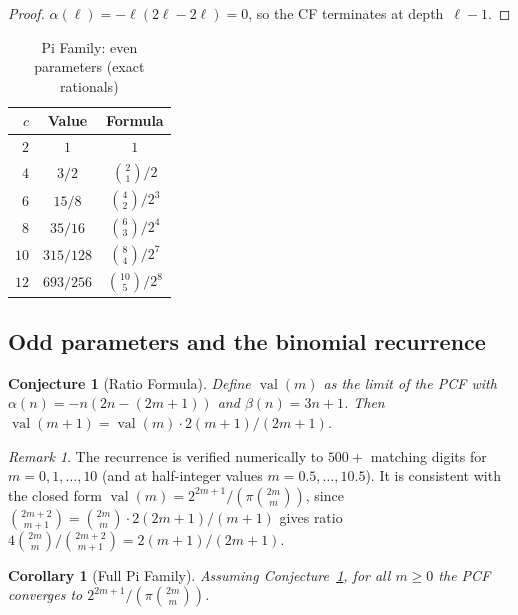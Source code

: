 \documentclass[11pt,a4paper]{article}
\theoremstyle{plain}
\newtheorem{corollary}[theorem]{Corollary}
\newtheorem{conjecture}[theorem]{Conjecture}
\theoremstyle{definition}
\theoremstyle{remark}
\newtheorem{remark}[theorem]{Remark}
\begin{document}
\begin{proof}
$\alpha(\ell) = -\ell(2\ell - 2\ell) = 0$, so the CF terminates
at depth~$\ell{-}1$.\end{proof}

\begin{table}[ht]
\centering
\caption{Pi Family: even parameters (exact rationals)}\label{tab:parity}
\begin{tabular}{@{}rcc@{}}
\toprule
$c$ & Value & Formula \\
\midrule
$2$ & $1$ & $1$ \\
$4$ & $3/2$ & $\binom{2}{1}/2$ \\
$6$ & $15/8$ & $\binom{4}{2}/2^3$ \\
$8$ & $35/16$ & $\binom{6}{3}/2^4$ \\
$10$ & $315/128$ & $\binom{8}{4}/2^7$ \\
$12$ & $693/256$ & $\binom{10}{5}/2^8$ \\
\bottomrule
\end{tabular}
\end{table}

\subsection{Odd parameters and the binomial recurrence}

\begin{conjecture}[Ratio Formula]\label{conj:ratio}
Define $\operatorname{val}(m)$ as the limit of the PCF with
$\alpha(n) = -n(2n{-}(2m{+}1))$ and $\beta(n) = 3n+1$.
Then $\operatorname{val}(m{+}1) = \operatorname{val}(m)\cdot 2(m{+}1)/(2m{+}1)$.
\end{conjecture}

\begin{remark}
The recurrence is verified numerically to $500{+}$ matching digits
for $m = 0, 1, \ldots, 10$ (and at half-integer values $m = 0.5, \ldots, 10.5$).
It is consistent with the closed form
$\operatorname{val}(m) = 2^{2m+1}/(\pi\binom{2m}{m})$, since
$\binom{2m+2}{m+1} = \binom{2m}{m}\cdot 2(2m{+}1)/(m{+}1)$ gives
ratio $4\binom{2m}{m}/\binom{2m+2}{m+1} = 2(m{+}1)/(2m{+}1)$.
\end{remark}

\begin{corollary}[Full Pi Family]\label{cor:pi}
Assuming Conjecture~\ref{conj:ratio}, for all $m \ge 0$ the PCF
converges to $2^{2m+1}/(\pi\binom{2m}{m})$.
\end{corollary}
\end{document}

